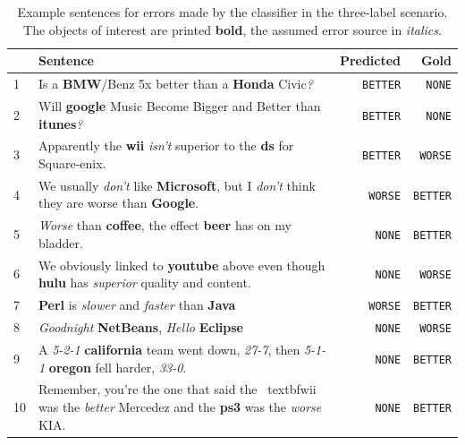 \begin{table}[h]
\caption{Example sentences for errors made by the classifier in the three-label scenario. The objects of interest are printed \textbf{bold}, the assumed error source in \emph{italics}.}
\label{tbl:3_mistakes}
\begin{tabularx}{\linewidth}{lXrr}
\toprule
 & Sentence & Predicted & Gold \\ \midrule
1 & Is a \textbf{BMW}/Benz 5x better than a \textbf{Honda} Civic\emph{?} & \texttt{BETTER} & \texttt{NONE} \\
2 & Will \textbf{google} Music Become Bigger and Better than \textbf{itunes}\emph{?}& \texttt{BETTER} & \texttt{NONE} \\

3 & Apparently the \textbf{wii} \emph{isn't} superior to the \textbf{ds} for Square-enix. & \texttt{BETTER} & \texttt{WORSE} \\
4 & We usually \emph{don't} like \textbf{Microsoft}, but I \emph{don't} think they are worse than \textbf{Google}. & \texttt{WORSE} & \texttt{BETTER} \\

5 & \emph{Worse} than \textbf{coffee}, the effect \textbf{beer} has on my bladder. & \texttt{NONE} & \texttt{BETTER} \\
6 & We obviously linked to \textbf{youtube} above even though \textbf{hulu} has \emph{superior} quality and content.  & \texttt{NONE} & \texttt{WORSE} \\

7 & \textbf{Perl} is \emph{slower} and \emph{faster} than \textbf{Java} & \texttt{WORSE} & \texttt{BETTER} \\

8 & \emph{Goodnight} \textbf{NetBeans}, \emph{Hello} \textbf{Eclipse} & \texttt{NONE} & \texttt{WORSE} \\

9 & A \emph{5-2-1} \textbf{california} team went down, \emph{27-7}, then \emph{5-1-1} \textbf{oregon} fell harder, \emph{33-0}. & \texttt{NONE} & \texttt{BETTER} \\

10 & Remember, you're the one that said the \ textbf{wii} was the \emph{better} Mercedez and the \textbf{ps3} was the \emph{worse} KIA. & \texttt{NONE} & \texttt{BETTER} \\


\bottomrule
\end{tabularx}

\end{table}

